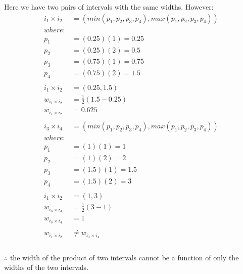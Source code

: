 \documentclass{report}
\newcommand{\?}{\stackrel{?}{=}}
\newcommand{\<}{\stackrel{?}{<}}
\begin{document}
Here we have two pairs of intervals with the same widths. However:
\begin{align}
i_1\times i_2 &= (min(p_1, p_2, p_3, p_4), max(p_1, p_2, p_3, p_4))\\
where:\\
p_1 &= (0.25)(1) = 0.25\\
p_2 &= (0.25)(2) = 0.5\\
p_3 &= (0.75)(1) = 0.75\\
p_4 &= (0.75)(2) = 1.5\\
\\
i_1\times i_2 &= (0.25, 1.5)\\
w_{i_1\times i_2} &= \frac{1}{2}(1.5 - 0.25)\\
w_{i_1\times i_2} &= 0.625\\
\\
i_3\times i_4 &= (min(p_1, p_2, p_3, p_4), max(p_1, p_2, p_3, p_4))\\
where:\\
p_1 &= (1)(1) = 1\\
p_2 &= (1)(2) = 2\\
p_3 &= (1.5)(1) = 1.5\\
p_4 &= (1.5)(2) = 3\\
\\
i_1\times i_2 &= (1, 3)\\
w_{i_3\times i_4} &= \frac{1}{2}(3 - 1)\\
w_{i_3\times i_4} &= 1\\
\\
w_{i_1\times i_2} &\neq w_{i_3\times i_4}\\
\end{align}\\
$\therefore$ the width of the product of two intervals cannot be a function of only the widths of the two intervals.
\pagebreak
\end{document}
